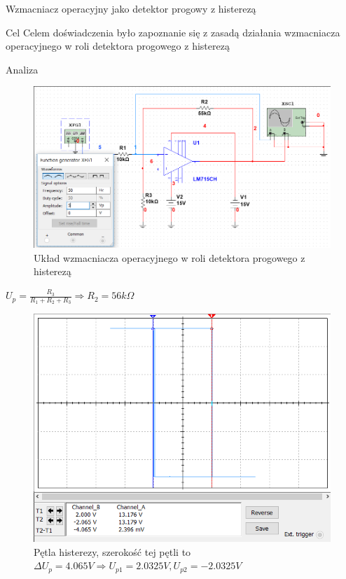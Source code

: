 \documentclass[a4paper]{scrartcl}
\begin{document}
	\clearpage
	\begin{section}{Wzmacniacz operacyjny jako detektor progowy z histerezą}
		\begin{subsection}{Cel}
			Celem doświadczenia było zapoznanie się z zasadą działania wzmacniacza operacyjnego w roli detektora progowego z histerezą
		\end{subsection}
		\begin{subsection}{Analiza}
				\begin{figure}[ht]
				\begin{center}
					\includegraphics[width=0.8\linewidth]{09-circuit}
					\caption{Układ wzmacniacza operacyjnego w roli detektora progowego z histerezą}
				\end{center}
				\end{figure}
				\begin{center}
				$ U_{p} = \frac{R_{3}}{R_{1}+R_{2}+R_{3}} \Rightarrow R_{2} = 56k\Omega $
				\end{center}
				\begin{figure}[!ht]
				\begin{center}
					\includegraphics[width=0.7\linewidth]{09-osc}
					\caption{Pętla histerezy, szerokość tej pętli to $ \Delta U_{p} = 4.065V \Rightarrow U_{p1} = 2.0325V, U_{p2} = -2.0325V $}
				\end{center}

\end{figure}
\end{subsection}
\end{section}
\end{document}
